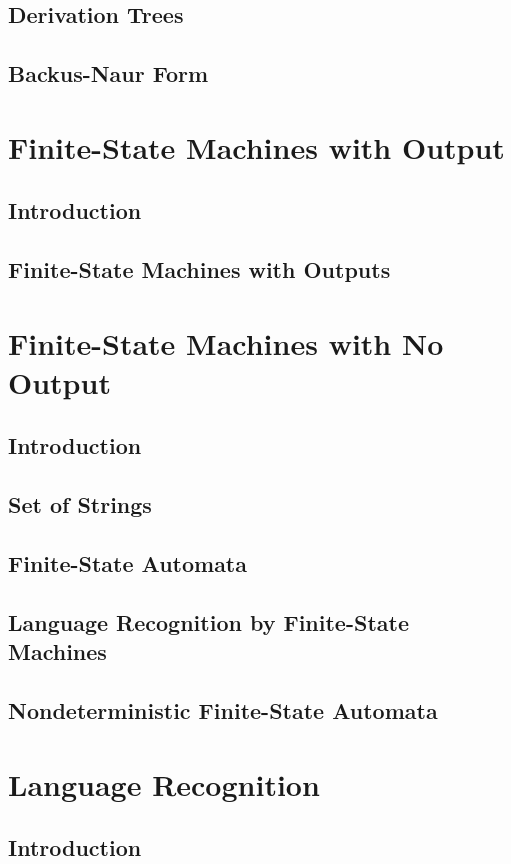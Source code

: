 \documentclass[11pt]{book}
\begin{document}
  \subsection{Derivation Trees}
  \subsection{Backus-Naur Form}
  
 \section{Finite-State Machines with Output}
  \subsection{Introduction}
  \subsection{Finite-State Machines with Outputs}
  

 \section{Finite-State Machines with No Output}
  \subsection{Introduction}
  \subsection{Set of Strings}
  \subsection{Finite-State Automata}
  \subsection{Language Recognition by Finite-State Machines}
  \subsection{Nondeterministic Finite-State Automata}
  
 \section{Language Recognition} 
  \subsection{Introduction}
\end{document}
